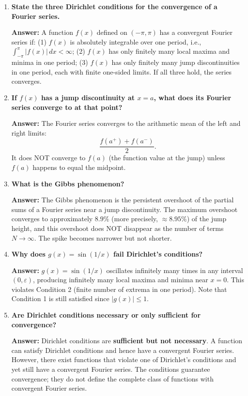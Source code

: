 \documentclass[12pt,a4paper]{article}
\begin{document}
\begin{enumerate}[label=\textbf{Q\arabic*.}]

\item \textbf{State the three Dirichlet conditions for the convergence of a Fourier series.}

   \textbf{Answer:} A function $f(x)$ defined on $(-\pi,\pi)$ has a convergent Fourier series if: (1) $f(x)$ is absolutely integrable over one period, i.e., $\int_{-\pi}^{\pi}|f(x)|\,dx < \infty$; (2) $f(x)$ has only finitely many local maxima and minima in one period; (3) $f(x)$ has only finitely many jump discontinuities in one period, each with finite one-sided limits. If all three hold, the series converges.

\item \textbf{If $f(x)$ has a jump discontinuity at $x=a$, what does its Fourier series converge to at that point?}

   \textbf{Answer:} The Fourier series converges to the arithmetic mean of the left and right limits:
   \[
      \frac{f(a^+)+f(a^-)}{2}.
   \]
   It does NOT converge to $f(a)$ (the function value at the jump) unless $f(a)$ happens to equal the midpoint.

\item \textbf{What is the Gibbs phenomenon?}

   \textbf{Answer:} The Gibbs phenomenon is the persistent overshoot of the partial sums of a Fourier series near a jump discontinuity. The maximum overshoot converges to approximately $8.9\%$ (more precisely, $\approx 8.95\%$) of the jump height, and this overshoot does NOT disappear as the number of terms $N \to \infty$. The spike becomes narrower but not shorter.

\item \textbf{Why does $g(x)=\sin(1/x)$ fail Dirichlet's conditions?}

   \textbf{Answer:} $g(x)=\sin(1/x)$ oscillates infinitely many times in any interval $(0,\varepsilon)$, producing infinitely many local maxima and minima near $x=0$. This violates Condition 2 (finite number of extrema in one period). Note that Condition 1 is still satisfied since $|g(x)|\leq 1$.

\item \textbf{Are Dirichlet conditions necessary or only sufficient for convergence?}

   \textbf{Answer:} Dirichlet conditions are \textbf{sufficient but not necessary}. A function can satisfy Dirichlet conditions and hence have a convergent Fourier series. However, there exist functions that violate one of Dirichlet's conditions and yet still have a convergent Fourier series. The conditions guarantee convergence; they do not define the complete class of functions with convergent Fourier series.


\end{enumerate}
\end{document}
